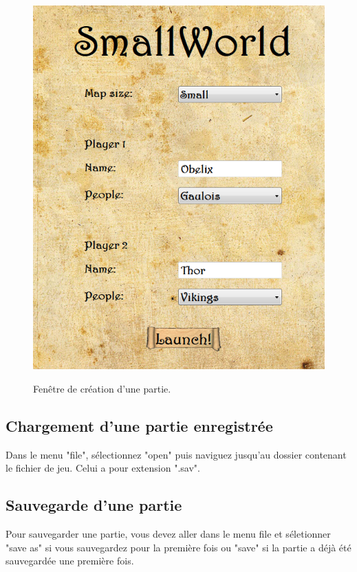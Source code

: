 \documentclass[a4paper,12pt]{article}
\begin{document}
\begin{figure}[H]
   \includegraphics[width=\textwidth]{create.png}
   \label{fig:create}
   \caption{Fenêtre de création d'une partie.}
\end{figure}
\FloatBarrier

\subsection{Chargement d'une partie enregistrée}
Dans le menu "file", sélectionnez "open" puis naviguez jusqu'au dossier contenant le fichier de jeu. Celui a pour extension ".sav".

\subsection{Sauvegarde d'une partie}
Pour sauvegarder une partie, vous devez aller dans le menu file et séletionner "save as" si vous sauvegardez pour la première fois ou "save" si la partie a déjà été sauvegardée une première fois.
\end{document}

